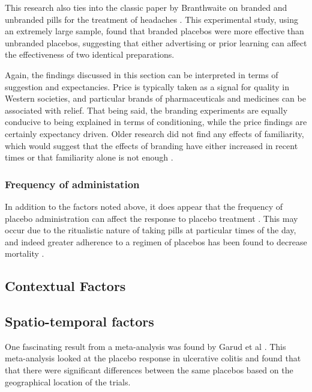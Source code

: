 This research also ties into the classic paper by Branthwaite on branded and unbranded pills for the treatment of headaches \cite{Branthwaite1981}. This experimental study, using an extremely large sample, found that branded placebos were more effective than unbranded placebos, suggesting that either advertising or prior learning can affect the effectiveness of two identical preparations. 

Again, the findings discussed in this section can be interpreted in terms of suggestion and expectancies. Price is typically taken as a signal for quality in Western societies, and particular brands of pharmaceuticals and medicines can be associated with relief. That being said, the branding experiments are equally conducive to being explained in terms of conditioning, while the price findings are certainly expectancy driven. Older research did not find any effects of familiarity, which would suggest that the effects of branding have either increased in recent times or that familiarity alone is not enough \cite{Morris1974}.  

\subsubsection{Frequency of administation}
\label{sec:freq-admin}

In addition to the factors noted above, it does appear that the frequency of placebo administration can affect the response to placebo treatment \cite{Moerman2000}. This may occur due to the ritualistic nature of taking pills at particular times of the day, and indeed greater adherence to a regimen of placebos has been found to decrease mortality \cite{Chewning2006b}. 

\subsection{Contextual Factors}
\label{sec:contextual-factors}



\subsection{Spatio-temporal factors}
\label{sec:geogr-diff-plac}

One fascinating result from a meta-analysis was found by Garud et al \cite{Garud2008}. This meta-analysis looked at the placebo response in ulcerative colitis and  found that  that there were significant differences between the same placebos based on the geographical location of the trials. 

